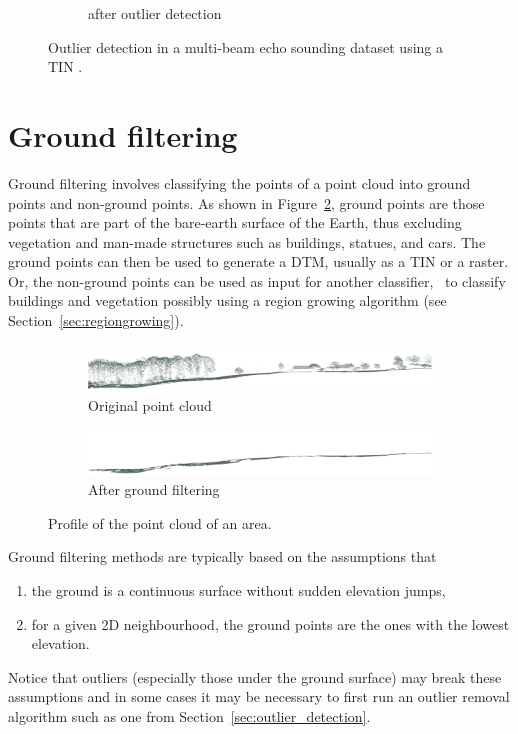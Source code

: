 \begin{figure}
\begin{subfigure}[b]{0.44\linewidth}
    \caption{after outlier detection}
  \end{subfigure}
\caption{Outlier detection in a multi-beam echo sounding dataset using a TIN \citep{Arge10}.}%
\label{fig:mbes}
\end{figure}



%
\section{Ground filtering}

Ground filtering involves classifying the points of a point cloud into ground points and non-ground points.
As shown in Figure~\ref{fig:filter-profile}, ground points are those points that are part of the bare-earth surface of the Earth, thus excluding vegetation and man-made structures such as buildings, statues, and cars.
The ground points can then be used to generate a DTM, usually as a TIN or a raster.
Or, the non-ground points can be used as input for another classifier, \eg\ to classify buildings and vegetation possibly using a region growing algorithm (see Section~\ref{sec:regiongrowing}).
\begin{figure}
  \centering
  \begin{subfigure}[b]{\linewidth}
    \centering
    \includegraphics[width=\textwidth]{filter-profile-before.png}
    \caption{Original point cloud}
  \end{subfigure}
  \begin{subfigure}[b]{\linewidth}
    \centering
    \includegraphics[width=\textwidth]{filter-profile-after.png}
    \caption{After ground filtering}
  \end{subfigure}
  \caption{Profile of the point cloud of an area.}%
  \label{fig:filter-profile}
\end{figure}

%

Ground filtering methods are typically based on the assumptions that 
\begin{enumerate}
  \item the ground is a continuous surface without sudden elevation jumps, 
  \item for a given 2D neighbourhood, the ground points are the ones with the lowest elevation.
\end{enumerate}
Notice that outliers (especially those under the ground surface) may break these assumptions and in some cases it may be necessary to first run an outlier removal algorithm such as one from Section~\ref{sec:outlier_detection}.

